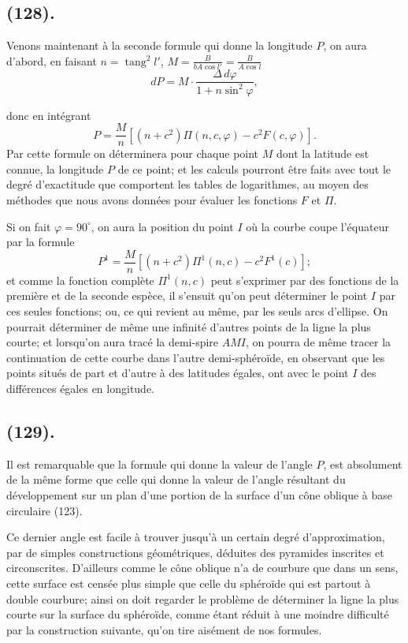 \documentclass{article}
\begin{document}
\subsection*{(128).}

Venons maintenant à la seconde formule qui donne la longitude $P$, on aura d'abord, en faisant $n=\operatorname{tang}^{2}l'$, $M=\frac{B}{bA\cos l'}=\frac{B}{A\cos l}$
\[ dP=M\cdot\frac{\Delta\,d\varphi}{1+n\sin^{2}\varphi}, \]

donc en intégrant
\[ P=\frac{M}{n}[(n+c^{2})\Pi(n,c,\varphi)-c^{2}F(c,\varphi)]. \]
Par cette formule on déterminera pour chaque point $M$ dont la latitude est connue, la longitude $P$ de ce point; et les calculs pourront être faits avec tout le degré d'exactitude que comportent les tables de logarithmes, au moyen des méthodes que nous avons données pour évaluer les fonctions $F$ et $\Pi$.

Si on fait $\varphi=90^{\circ}$, on aura la position du point $I$ où la courbe coupe l'équateur par la formule
\[ P^{1}=\frac{M}{n}[(n+c^{2})\Pi^{1}(n,c)-c^{2}F^{1}(c)]; \]
et comme la fonction complète $\Pi^{1}(n,c)$ peut s'exprimer par des fonctions de la première et de la seconde espèce, il s'ensuit qu'on peut déterminer le point $I$ par ces seules fonctions; ou, ce qui revient au même, par les seuls arcs d'ellipse. On pourrait déterminer de même une infinité d'autres points de la ligne la plus courte; et lorsqu'on aura tracé la demi-spire $AMI$, on pourra de même tracer la continuation de cette courbe dans l'autre demi-sphéroïde, en observant que les points situés de part et d'autre à des latitudes égales, ont avec le point $I$ des différences égales en longitude.

\subsection*{(129).}

Il est remarquable que la formule qui donne la valeur de l'angle $P$, est absolument de la même forme que celle qui donne la valeur de l'angle résultant du développement sur un plan d'une portion de la surface d'un cône oblique à base circulaire (123).

Ce dernier angle est facile à trouver jusqu'à un certain degré d'approximation, par de simples constructions géométriques, déduites des pyramides inscrites et circonscrites. D'ailleurs comme le cône oblique n'a de courbure que dans un sens, cette surface est censée plus simple que celle du sphéroïde qui est partout à double courbure; ainsi on doit regarder le problème de déterminer la ligne la plus courte sur la surface du sphéroïde, comme étant réduit à une moindre difficulté par la construction suivante, qu'on tire aisément de nos formules.
\end{document}
